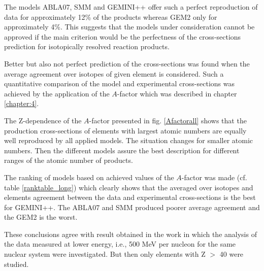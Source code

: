 The models ABLA07, SMM and GEMINI++ offer such a
perfect reproduction of data for approximately 12\% of the
products whereas GEM2 only for approximately 4\%. This
suggests that the models under consideration cannot be
approved if the main criterion would be the  perfectness of the cross-sections prediction 
for isotopically resolved reaction products.

Better but also not perfect prediction of the cross-sections
was found when the average agreement over isotopes
of given element is considered. Such a quantitative comparison
of the model and experimental cross-sections was
achieved by the application of the $A$-factor  which was described in chapter \ref{chapter:4}. 


The Z-dependence of the $A$-factor presented in
fig. \ref{Afactorall} shows that the production cross-sections of elements
with largest atomic numbers are equally well reproduced
by all applied models. The situation changes for
smaller atomic numbers. Then the different models assure the
best description for different ranges of the atomic number
of products. 

The ranking of models based on achieved values
of the $A$-factor was made (cf. table \ref{ranktable_long}) which clearly
shows that the averaged over isotopes and elements agreement
between the data and experimental cross-sections is
the best for GEMINI++. 
The ABLA07 and SMM produced
poorer average agreement and the GEM2 is the
worst.

These conclusions agree with result obtained in the work \cite{sharma2017ranking} in which the analysis of the data measured 
at lower energy, i.e., 500 MeV per nucleon for the
same nuclear system were investigated. 
But then only elements with Z $>$ 40 were studied. 

